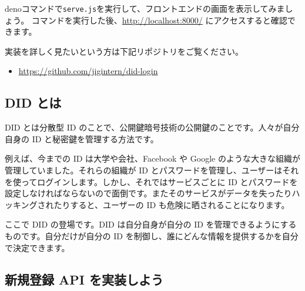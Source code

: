 \begin{Shaded}
\begin{Highlighting}[]
\end{Highlighting}
\end{Shaded}

denoコマンドで\texttt{serve.js}を実行して、フロントエンドの画面を表示してみましょう。
コマンドを実行した後、\url{http://localhost:8000/}
にアクセスすると確認できます。

\begin{Shaded}
\begin{Highlighting}[]
 
\end{Highlighting}
\end{Shaded}

実装を詳しく見たいという方は下記リポジトリをご覧ください。

\begin{itemize}
\tightlist
\item
  \url{https://github.com/jigintern/did-login}
\end{itemize}

\subsection{DID とは}\label{did-ux3068ux306f}

DID とは分散型 ID
のことで、公開鍵暗号技術の公開鍵のことです。人々が自分自身の ID
と秘密鍵を管理する方法です。

例えば、今までの ID は大学や会社、Facebook や Google
のような大きな組織が管理していました。それらの組織が ID
とパスワードを管理し、ユーザーはそれを使ってログインします。しかし、それではサービスごとに
ID
とパスワードを設定しなければならないので面倒です。またそのサービスがデータを失ったりハッキングされたりすると、ユーザーの
ID も危険に晒されることになります。

ここで DID の登場です。DID は自分自身が自分の ID
を管理できるようにするものです。自分だけが自分の ID
を制御し、誰にどんな情報を提供するかを自分で決定できます。

\subsection{新規登録 API
を実装しよう}\label{ux65b0ux898fux767bux9332-api-ux3092ux5b9fux88c5ux3057ux3088ux3046}

